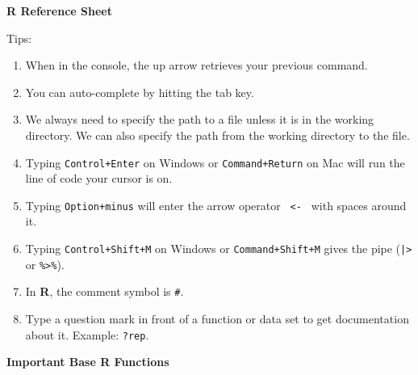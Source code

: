 \documentclass[11pt]{article}
\begin{document}
\large
\begin{tcolorbox}[width=\linewidth, sharp corners=all, colback=white!100!black]


\begin{center} {\huge{\bf R Reference Sheet}} \end{center}

\end{tcolorbox}


Tips:\vspace{-.1in}
\begin{enumerate}
	\item When in the console, the up arrow retrieves your previous command.
	\item You can auto-complete by hitting the tab key.
	\item We always need to specify the path to a file unless it is in the working directory. We can also specify the path from the working directory to the file.
	\item Typing \texttt{Control+Enter} on Windows or \texttt{Command+Return} on Mac will run the line of code your cursor is on.
	\item Typing \texttt{Option+minus} will enter the arrow operator \texttt{ <- } with spaces around it.
	\item Typing \texttt{Control+Shift+M} on Windows or \texttt{Command+Shift+M} gives the pipe (\texttt{|>} or \texttt{\%>\%}).
	\item In {\bf R}, the comment symbol is \texttt{\#}.
	\item Type a question mark in front of a function or data set to get documentation about it. Example: \texttt{?rep}.
\end{enumerate}

\begin{tcolorbox}[width=2.75in, sharp corners=all, colback=white!95!black] %
{\bf Important Base R Functions}
\end{tcolorbox}

\vspace{-.1in}
\end{document}
